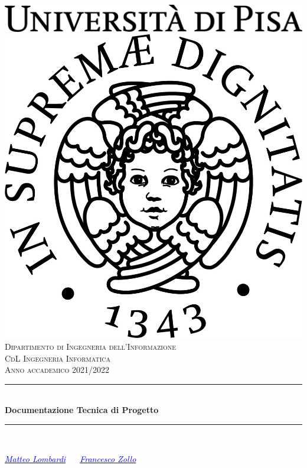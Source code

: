 \documentclass[12pt,a4paper]{report}
\begin{document}
 
\begin{titlepage}
    \newcommand{\HRule}{\rule{\linewidth}{0.5mm}}
    \center
    \includegraphics[scale=0.8]{logo_black}\\[1.5cm]
    \includegraphics[scale=1.4]{cherubino_black}\\[1cm]
    \textsc{\Large Dipartimento di Ingegneria dell'Informazione}\\[0.5cm]
    \textsc{\large CdL Ingegneria Informatica}\\[0.3cm] \textsc{\large Anno accademico 2021/2022} \\ [0.5cm]
    \HRule \\[0.4cm]
    { \huge \bfseries Documentazione Tecnica di Progetto}\\[0.4cm]
    \HRule \\[1cm]
    \begin{minipage}{1 \textwidth}
    \begin{center} \LARGE
        \emph{ \href{https://github.com/LombardiMatteo}{\textcolor{blue}{Matteo Lombardi}} $\quad$  \href{https://www.linkedin.com/in/francesco-zollo/}{\textcolor{blue}{Francesco Zollo}}}\\
    \end{center}
\end{minipage}\\[2cm]
\vfill
\end{titlepage}
\end{document}
